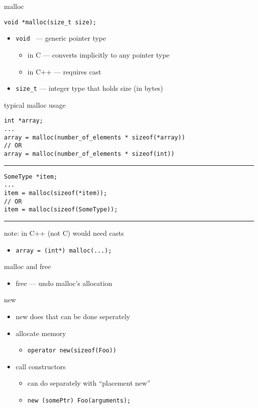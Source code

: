 \begin{frame}[fragile,label=mallocPrototype]{malloc}
\lstset{language=C++,style=small}
\begin{lstlisting}
void *malloc(size_t size);
\end{lstlisting}
\begin{itemize}
\item \texttt{void \*} --- generic pointer type
    \begin{itemize}
    \item in C --- converts implicitly to any pointer type
    \item in C++ --- requires cast
    \end{itemize}
\item \texttt{size\_t} --- integer type that holds size (in bytes)
\end{itemize}
\end{frame}

\begin{frame}[fragile,label=mallocUsage1]{typical malloc usage}
\lstset{language=C++,style=smaller}
\begin{lstlisting}
int *array;
...
array = malloc(number_of_elements * sizeof(*array))
// OR
array = malloc(number_of_elements * sizeof(int))
\end{lstlisting}
\hrule
\begin{lstlisting}
SomeType *item;
...
item = malloc(sizeof(*item));
// OR
item = malloc(sizeof(SomeType));
\end{lstlisting}
\hrule
note: in C++ (not C) would need casts
    \begin{itemize}
        \item \lstinline|array = (int*) malloc(...);|
    \end{itemize}
\end{frame}

\begin{frame}{malloc and free}
\begin{itemize}
\item free --- undo malloc's allocation
\end{itemize}
\end{frame}

\begin{frame}[fragile,label=newParts]{new}
\lstset{language=C++}
\begin{itemize}
    \item new does  that can be done seperately
    \vspace{.5cm}
    \item allocate memory
        \begin{itemize}
        \item \texttt{operator new(sizeof(Foo))}
        \end{itemize}
    \item call constructors
        \begin{itemize}
        \item can do separately with ``placement new''
        \item \lstinline|new (somePtr) Foo(arguments);|
        \end{itemize}
    \end{itemize}
\end{frame}

